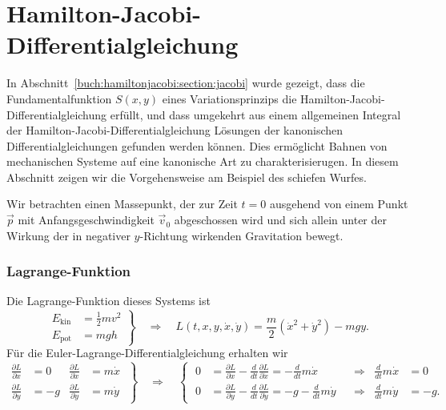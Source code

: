 %
%
%
\section{Hamilton-Jacobi-Differentialgleichung
\label{buch:mechanik:section:jacobi}}
In Abschnitt~\ref{buch:hamiltonjacobi:section:jacobi} wurde gezeigt,
dass die Fundamentalfunktion $S(x,y)$ eines Variationsprinzips 
die Hamilton-Jacobi-Differentialgleichung erfüllt, und dass umgekehrt
aus einem allgemeinen Integral der Hamilton-Jacobi-Differentialgleichung
Lösungen der kanonischen Differentialgleichungen gefunden werden können.
Dies ermöglicht Bahnen von mechanischen Systeme auf eine kanonische
Art zu charakterisierugen.
In diesem Abschnitt zeigen wir die Vorgehensweise am Beispiel
des schiefen Wurfes.

Wir betrachten einen Massepunkt, der zur Zeit $t=0$ ausgehend von einem
Punkt $\vec{p}$ mit Anfangsgeschwindigkeit $\vec{v}_0$ abgeschossen
wird und sich allein unter der Wirkung der in negativer $y$-Richtung
wirkenden Gravitation bewegt.

%
%
\subsubsection{Lagrange-Funktion}
Die Lagrange-Funktion dieses Systems ist
\[
\left.
\begin{aligned}
E_{\text{kin}}
&=
\frac12 mv^2
\\
E_{\text{pot}}
&=
mgh
\end{aligned}
\right\}
\quad\Rightarrow\quad
L(t,x,y,\dot{x},\dot{y})
=
\frac{m}2 (\dot{x}^2 + \dot{y}^2)
-
mgy.
\]
Für die Euler-Lagrange-Differentialgleichung erhalten wir
\begin{equation}
\left.
\begin{aligned}
\frac{\partial L}{\partial x}
&=
0
&
\frac{\partial L}{\partial \dot{x}}
&=
m\dot{x}
\\
\frac{\partial L}{\partial y}
&=
-g
&
\frac{\partial L}{\partial \dot{y}}
&=
m\dot{y}
\end{aligned}
\;\right\}
\quad\Rightarrow\quad
\left\{\;
\begin{aligned}
0
&=
\frac{\partial L}{\partial x}-\frac{d}{dt}\frac{\partial L}{\partial\dot{x}}
=
-\frac{d}{dt}m\dot{x}
&&\Rightarrow&\frac{d}{dt}m\dot{x}&=0
\\
0
&=
\frac{\partial L}{\partial y}-\frac{d}{dt}\frac{\partial L}{\partial\dot{y}}
=
-g
-\frac{d}{dt}m\dot{y}
&&\Rightarrow&\frac{d}{dt}m\dot{y}&=-g.
\end{aligned}
\right.
\label{buch:mechanik:jacobi:wurf:eqn:bewegungsgleichung}
\end{equation}


